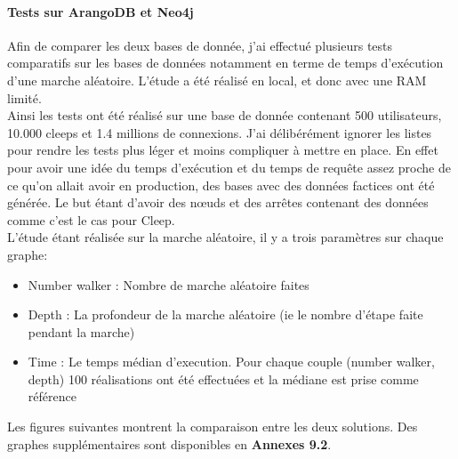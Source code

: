 \documentclass{article} %
\begin{document}
\paragraph{Tests sur ArangoDB et Neo4j\\}
Afin de comparer les deux bases de donnée, j'ai effectué plusieurs tests comparatifs sur les bases de données notamment en terme de temps d'exécution d'une marche aléatoire. L'étude a été réalisé en local, et donc avec une RAM limité.\\
Ainsi les tests ont été réalisé sur une base de donnée contenant 500 utilisateurs, 10.000 cleeps et 1.4 millions de connexions. J'ai délibérément ignorer les listes pour rendre les tests plus léger et moins compliquer à mettre en place. En effet pour avoir une idée du temps d'exécution et du temps de requête assez proche de ce qu'on allait avoir en production, des bases avec des données factices ont été générée. Le but étant d'avoir des nœuds et des arrêtes contenant des données comme c'est le cas pour Cleep.\\
L'étude étant réalisée sur la marche aléatoire, il y a trois paramètres sur chaque graphe: 
\begin{itemize}
	\item Number walker : Nombre de marche aléatoire faites
	\item Depth : La profondeur de la marche aléatoire (ie le nombre d'étape faite pendant la marche)
	\item Time : Le temps médian d’execution. Pour chaque couple (number walker, depth) 100 réalisations ont été effectuées et la médiane est prise comme référence
\end{itemize} 
Les figures suivantes montrent la comparaison entre les deux solutions. Des graphes supplémentaires sont disponibles en \textbf{Annexes 9.2}.
\end{document}
